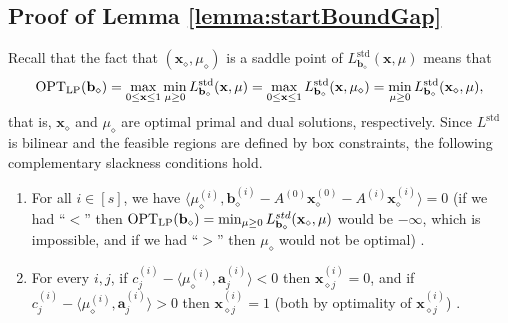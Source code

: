 \documentclass{article}
\newcommand{\av}[0]{\mathbf{a}}
\newcommand{\xv}[0]{\mathbf{x}}
\newcommand{\bv}[0]{\mathbf{b}}
\newcommand{\LP}{\text{LP}}
\newcommand{\iprods}[2]{\langle {#1}, {#2} \rangle}
\newcommand{\colij}{\av^{(i)}_j}
\newcommand{\OPT}{\textup{OPT}}
\begin{document}
\subsection{Proof of Lemma \ref{lemma:startBoundGap}} \label{sec:firstBound}
Recall that the fact that $(\xv_{\diamond}, \mu_{\diamond})$ is a saddle point
of $L^{\mathrm{std}}_{\bv_{\diamond}}(\xv,\mu)$ means that
\[
\OPT_{\LP}(\bv_{\diamond})
= \max_{0 \le \xv \le 1} \min_{\mu \ge 0} L^{\mathrm{std}}_{\bv_{\diamond}}(\xv,\mu)
= \max_{0 \le \xv \le 1} L^{\mathrm{std}}_{\bv_{\diamond}}(\xv,\mu_{\diamond})
= \min_{\mu \ge 0} L^{\mathrm{std}}_{\bv_{\diamond}}(\xv_{\diamond},\mu),
\]
that is, $\xv_{\diamond}$ and $\mu_{\diamond}$ are optimal primal and dual
solutions, respectively.
Since $L^{\mathrm{std}}$ is bilinear and the feasible regions are defined by box
constraints, the following complementary slackness conditions hold.



\begin{enumerate}[label={(cs.\roman*)}]
\item For all $i \in [s]$, we have $\iprods{\mu_{\diamond}^{(i)}}{\bv^{(i)}_{\diamond} - A^{(0)} \xv^{(0)}_{\diamond} - A^{(i)} \xv^{(i)}_{\diamond}} = 0$ (if we had ``$<$'' then $\OPT_{\LP}(\bv_{\diamond}) = \min_{\mu \ge 0} L^{std}_{\bv_{\diamond}}(\xv_{\diamond},\mu)$ would be $-\infty$, which is impossible, and if we had ``$>$'' then $\mu_{\diamond}$ would not be optimal) \label{cs.i}. 
 \item For every $i,j$, if $c^{(i)}_j - \iprods{\mu_{\diamond}^{(i)}}{\colij} < 0$ then $\xv_{\diamond j}^{(i)} = 0$, and if $c^{(i)}_j - \iprods{\mu_{\diamond}^{(i)}}{\colij} > 0$ then $\xv_{\diamond j}^{(i)} = 1$ (both by optimality of $\xv_{\diamond j}^{(i)}$) \label{cs.ii}.
\end{enumerate}
\end{document}
